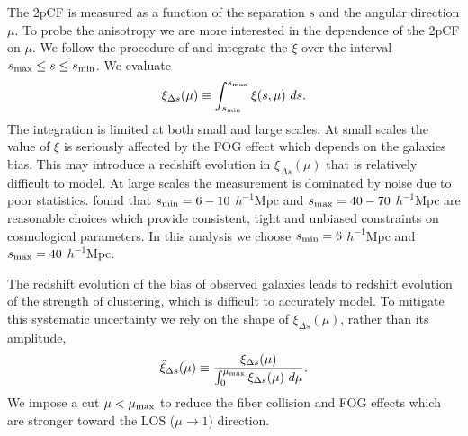 \documentclass[iop]{emulateapj}
\begin{document}
The 2pCF is measured as a function of the separation $s$ and the angular direction $\mu$.
To probe the anisotropy we are more interested in the dependence of the 2pCF on $\mu$.
We follow the procedure of \cite{Li2015} and integrate the $\xi$ over the interval $s_{\rm max} \leq s \leq s_{\rm min}$.
We evaluate
\begin{equation}\label{eq:xideltas}
\xi_{\Delta s} (\mu) \equiv \int_{s_{\rm min}}^{s_{\rm max}} \xi (s,\mu)\ ds.%
\end{equation}
The integration is limited at both small and large scales.
At small scales the value of $\xi$ is seriously affected by the FOG effect \citep{FOG}
which depends on the galaxies bias.
This may introduce a redshift evolution in $\xi_{\Delta s}(\mu)$ that is relatively difficult to model.
At large scales the measurement is dominated by noise due to poor statistics.
\cite{Li2015} found that $s_{\rm min}=6-10$ $h^{-1}$Mpc and $s_{\rm max}=40-70$ $h^{-1}$Mpc are reasonable choices 
which provide consistent, tight and unbiased constraints on cosmological parameters.
In this analysis we choose $s_{\rm min}=6$ $h^{-1}$Mpc and $s_{\rm max}=40$ $h^{-1}$Mpc.

The redshift evolution of the bias of observed galaxies leads to redshift evolution of the strength of clustering,
which is difficult to accurately model.
To mitigate this systematic uncertainty we rely on the shape of $\xi_{\Delta s}(\mu)$, rather than its amplitude,
\begin{equation}\label{eq:norm}
 \hat\xi_{\Delta s}(\mu) \equiv \frac{\xi_{\Delta s}(\mu)}{\int_{0}^{\mu_{\rm max}}\xi_{\Delta s}(\mu)\ d\mu}.
\end{equation}
We impose a cut $\mu<\mu_{\rm max}$ to reduce the fiber collision and FOG effects which are stronger toward the LOS ($\mu\rightarrow1$) direction.
\end{document}
